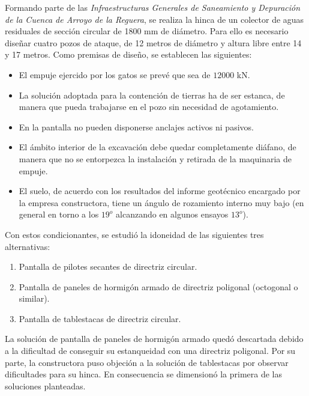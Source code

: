 


Formando parte de las \emph{Infraestructuras Generales de Saneamiento y Depuración de la Cuenca de Arroyo de la Reguera}, se realiza la hinca de un colector de aguas residuales de sección circular de 1800 mm de diámetro. Para ello es necesario diseñar cuatro pozos de ataque, de 12 metros de diámetro y altura libre entre 14 y 17 metros. 
Como premisas de diseño, se establecen las siguientes:
\begin{itemize}
\item El empuje ejercido por los gatos se prevé que sea de $12000$ kN.
\item La solución adoptada para la contención de tierras ha de ser estanca, de manera que pueda trabajarse en el pozo sin necesidad de agotamiento.
\item En la pantalla no pueden disponerse anclajes activos ni pasivos.
\item El ámbito interior de la excavación debe quedar completamente diáfano, de manera que no se entorpezca la instalación y retirada de la maquinaria de empuje.
  \item El suelo, de acuerdo con los resultados del informe geotécnico encargado por la empresa constructora, tiene un ángulo de  rozamiento interno muy bajo (en general en torno a los $19^o$ alcanzando en algunos ensayos $13^o$).
\end{itemize}



Con estos condicionantes, se estudió la idoneidad de las siguientes tres alternativas:
\begin{enumerate}
\item Pantalla de pilotes secantes de directriz circular.
\item Pantalla de paneles de hormigón armado de directriz poligonal (octogonal o similar).
\item Pantalla de tablestacas de directriz circular.
\end{enumerate}
 La solución de pantalla de paneles de hormigón armado quedó descartada debido a la dificultad de conseguir su estanqueidad con una directriz poligonal. Por su parte, la constructora puso objeción a la solución de tablestacas por observar dificultades para su hinca. En consecuencia se dimensionó la primera de las soluciones planteadas.



